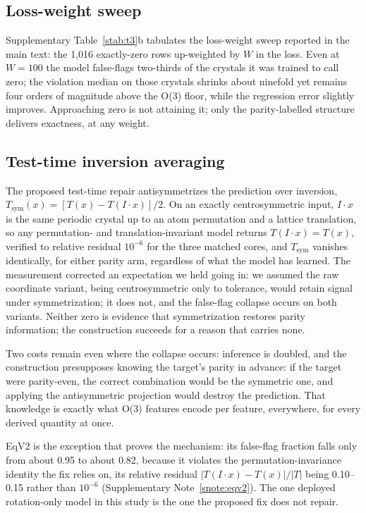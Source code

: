 \subsection*{Loss-weight sweep}

Supplementary Table~\ref{stab:t3}b tabulates the loss-weight sweep reported in the main text: the 1,016 exactly-zero rows up-weighted by $W$ in the loss. Even at $W = 100$ the model false-flags two-thirds of the crystals it was trained to call zero; the violation median on those crystals shrinks about ninefold yet remains four orders of magnitude above the O(3) floor, while the regression error slightly improves. Approaching zero is not attaining it; only the parity-labelled structure delivers exactness, at any weight.


\subsection*{Test-time inversion averaging}\label{snote:inversion}

The proposed test-time repair antisymmetrizes the prediction over inversion, $T_{\mathrm{sym}}(x) = [T(x) - T(I\!\cdot\!x)]/2$. On an exactly centrosymmetric input, $I\!\cdot\!x$ is the same periodic crystal up to an atom permutation and a lattice translation, so any permutation- and translation-invariant model returns $T(I\!\cdot\!x) = T(x)$, verified to relative residual $10^{-6}$ for the three matched cores, and $T_{\mathrm{sym}}$ vanishes identically, for either parity arm, regardless of what the model has learned. The measurement corrected an expectation we held going in: we assumed the raw coordinate variant, being centrosymmetric only to tolerance, would retain signal under symmetrization; it does not, and the false-flag collapse occurs on both variants. Neither zero is evidence that symmetrization restores parity information; the construction succeeds for a reason that carries none.

Two costs remain even where the collapse occurs: inference is doubled, and the construction presupposes knowing the target's parity in advance: if the target were parity-even, the correct combination would be the symmetric one, and applying the antisymmetric projection would destroy the prediction. That knowledge is exactly what O(3) features encode per feature, everywhere, for every derived quantity at once.

EqV2 is the exception that proves the mechanism: its false-flag fraction falls only from about 0.95 to about 0.82, because it violates the permutation-invariance identity the fix relies on, its relative residual $|T(I\!\cdot\!x) - T(x)|/|T|$ being 0.10--0.15 rather than $10^{-6}$ (Supplementary Note~\ref{snote:eqv2}). The one deployed rotation-only model in this study is the one the proposed fix does not repair.

